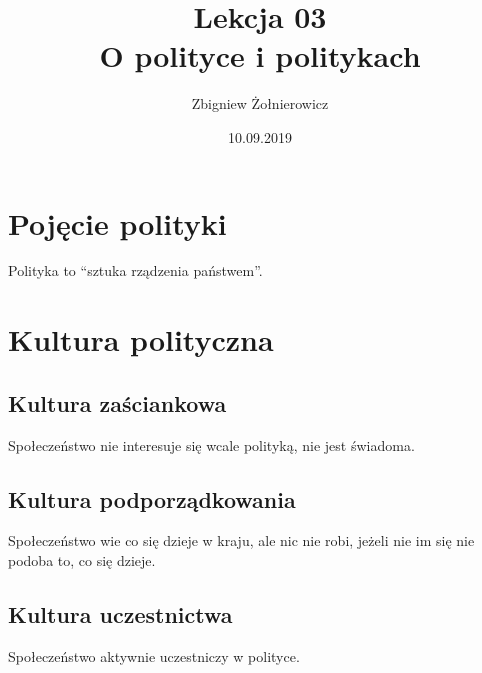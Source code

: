 \documentclass[a4paper]{article}
\begin{document}
\title{{\huge Lekcja 03} \\
{\large O polityce i politykach}}
\author{Zbigniew Żołnierowicz}
\date{10.09.2019}
\maketitle
\section{Pojęcie polityki}
Polityka to ``sztuka rządzenia państwem''.
\section{Kultura polityczna}
\subsection{Kultura zaściankowa}
Społeczeństwo nie interesuje się wcale polityką, nie jest świadoma.
\subsection{Kultura podporządkowania}
Społeczeństwo wie co się dzieje w kraju, ale nic nie robi, jeżeli nie im się nie podoba to, co się dzieje.
\subsection{Kultura uczestnictwa}
Społeczeństwo aktywnie uczestniczy w polityce.
\end{document}
